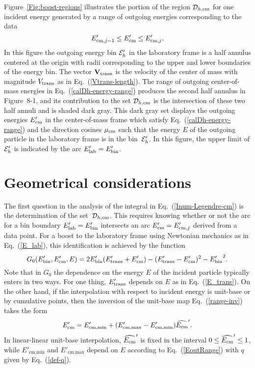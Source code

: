 Figure~\ref{Fig:boost-regions} illustrates the portion of the region ${\cal D}_{h, \text{cm} }$
for one incident energy generated by a range of outgoing energies 
corresponding to the data
\begin{equation}
  E'_{\text{cm}, j-1} \le E_{\text{cm}}' \le  E'_{\text{cm}, j}.
 \label{calDh-energy-range}
\end{equation}
In this figure the outgoing energy bin ${\cal E}_h'$ in the laboratory frame
 is a half annulus
centered at the origin with radii corresponding to the upper and
lower boundaries of the energy bin.
The vector $\textbf{V}_{\text{trans}}$ is the velocity of the center of mass 
with magnitude $V_{\text{trans}}$ as in Eq.~(\ref{Vtrans-length}).
The range of outgoing center-of-mass energies in Eq.~(\ref{calDh-energy-range})
produces the second half annulus in Figure~8-1, and its contribution to
the set ${\cal D}_{h, \text{cm} }$
is the intersection of these two half annuli and is shaded dark gray.
This dark gray set displays the outgoing energies $E_{\text{cm}}'$ in the center-of-mass frame
which satisfy Eq.~(\ref{calDh-energy-range}) and the direction cosines
$\mu_{\text{cm}}$ such that the energy $E$ of the outgoing particle in the laboratory
frame is in the bin~${\cal E}_h'$.  In this figure, the upper limit of ${\cal E}_h'$ is
indicated by the arc $E_{\text{lab}}' = E_{\text{bin}}'$.

\begin{figure}

\end{figure}

\section{Geometrical considerations}
\label{Sec:boost-geometry}
The first question in the analysis of the integral in Eq.~(\ref{Inum-Legendre-cm})
is the determination of the set~${\cal D}_{h, \text{cm} }$.  This requires
knowing whether or not the arc for a bin boundary $E_{\text{lab}}' = E_{\text{bin}}'$ 
intersects an arc $E_{\text{cm}}' = E'_{\text{cm},j}$ derived from a data point.  For a boost
to the laboratory frame using Newtonian mechanics as in Eq.~(\ref{E_lab}),
this identification is achieved by the function
\begin{equation}
  G_0( E_{\text{bin}}',  E_{\text{cm}}', E ) = 2 E_{\text{bin}}'( E_{\text{trans}}' + E_{\text{cm}}' ) -
    ( E_{\text{trans}}' - E_{\text{cm}}' )^2 - {E_{\text{bin}}'}^2.
  \label{def-G0}
\end{equation}
Note that in $G_0$ the dependence on the energy $E$ of the
incident particle typically enters in two ways.  For one thing, 
$E_{\text{trans}}'$ depends on $E$ as
in Eq.~(\ref{E_trans}).  On the other hand, if the interpolation with
respect to incident energy is unit-base or by cumulative 
points, then the inversion of the unit-base map Eq.~(\ref{range-inv}) 
takes the form
\begin{equation}
  E_{\text{cm}}' = E'_{\text{cm}, \text{min}} +
     ( E'_{\text{cm}, \text{max}} - E'_{\text{cm}, \text{min}} ) 
    \widehat {E_{\text{cm}}}'.
 \label{Kalb-unit-base}
\end{equation}
In linear-linear unit-base interpolation, $\widehat {E_{\text{cm}}}'$ is fixed in
the interval $0 \le \widehat {E_{\text{cm}}}' \le 1$, while
$E'_{\text{cm}, \text{min}}$
and $E'_{\text{cm}, \text{max}}$ depend on $E$ according to
Eq.~(\ref{EoutRange}) with $q$ given by Eq.~(\ref{def-q}).

